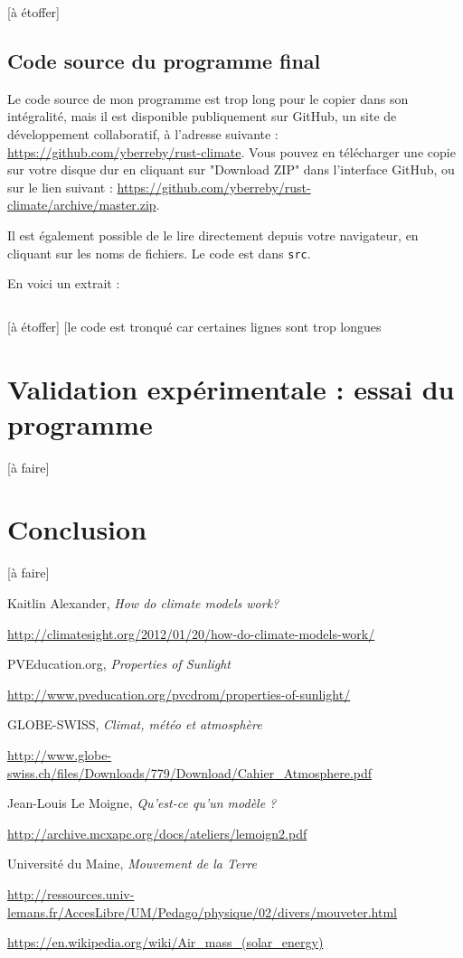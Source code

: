 \documentclass[12pt]{article}
\begin{document}
[à étoffer]

\subsection{Code source du programme final}
Le code source de mon programme est trop long pour le copier dans son intégralité, mais il est disponible publiquement sur GitHub, un site de développement collaboratif, à l'adresse suivante : \url{https://github.com/yberreby/rust-climate}. Vous pouvez en télécharger une copie sur votre disque dur en cliquant sur "Download ZIP" dans l'interface GitHub, ou sur le lien suivant : \url{https://github.com/yberreby/rust-climate/archive/master.zip}.

Il est également possible de le lire directement depuis votre navigateur, en cliquant sur les noms de fichiers. Le code est dans \texttt{src}.

En voici un extrait :

\inputminted[linenos]{rust}{temperature.rs}

[à étoffer]
[le code est tronqué car certaines lignes sont trop longues

\clearpage
\section{Validation expérimentale : essai du programme}

[à faire]

\clearpage
\section{Conclusion}

[à faire]


\begin{thebibliography}{9}

Kaitlin Alexander, \textit{How do climate models work?}

\url{http://climatesight.org/2012/01/20/how-do-climate-models-work/}


PVEducation.org, \textit{Properties of Sunlight}

\url{http://www.pveducation.org/pvcdrom/properties-of-sunlight/}


GLOBE-SWISS, \textit{Climat, météo et atmosphère}

\url{http://www.globe-swiss.ch/files/Downloads/779/Download/Cahier_Atmosphere.pdf}


Jean-Louis Le Moigne, \textit{Qu'est-ce qu'un modèle ?}

\url{http://archive.mcxapc.org/docs/ateliers/lemoign2.pdf}


Université du Maine, \textit{Mouvement de la Terre}

\url{http://ressources.univ-lemans.fr/AccesLibre/UM/Pedago/physique/02/divers/mouveter.html}



\url{https://en.wikipedia.org/wiki/Air_mass_(solar_energy)}



\end{thebibliography}
\end{document}
